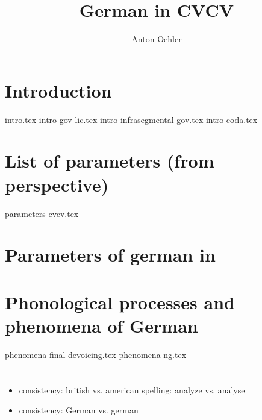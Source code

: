 \documentclass[
]{scrartcl}
\title{German in CVCV}
\author{Anton Oehler}
\begin{document}
\maketitle


\tableofcontents

\section{Introduction}
{intro.tex}
{intro-gov-lic.tex}
{intro-infrasegmental-gov.tex}
{intro-coda.tex}


\section{List of parameters (from \CVCV perspective)}
{parameters-cvcv.tex}

\section{Parameters of german in \CVCV}

\section{Phonological processes and phenomena of German}
{phenomena-final-devoicing.tex}
{phenomena-ng.tex}

\section*{\TODO{}}
\begin{itemize}
\item consistency: british vs. american spelling: analyze vs. analyse
\item consistency: German vs. german
\end{itemize}

\printbibliography
\end{document}
